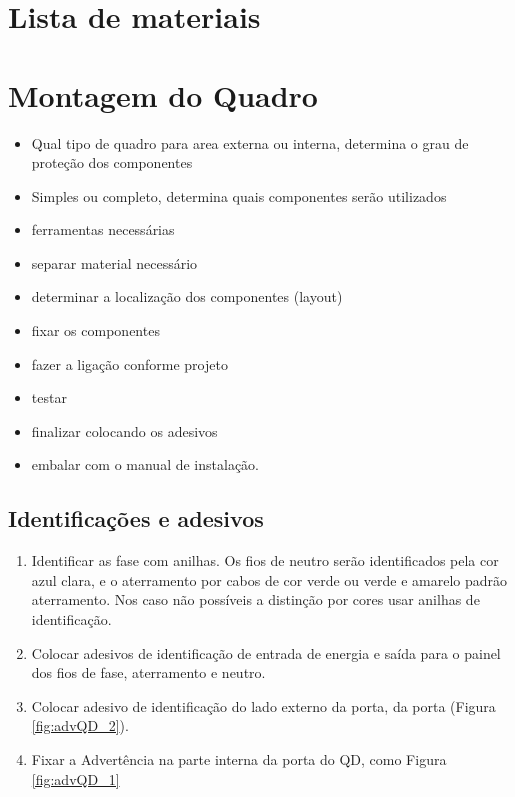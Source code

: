 \section{Lista de materiais}



\section{Montagem do Quadro}
\begin{itemize}
\item Qual tipo de quadro
\subitem para area externa ou interna, determina o grau de proteção dos componentes
\item Simples ou completo, determina quais componentes serão utilizados
\item ferramentas necessárias
\item  separar material necessário
\item determinar a localização dos componentes (layout)
\item fixar os componentes
\item fazer a ligação conforme projeto
\item testar
\item finalizar colocando os adesivos 
\item embalar com o manual de instalação. 

\end{itemize}

\subsection{Identificações e adesivos}
\begin{enumerate}
\item Identificar as fase com anilhas. Os fios de neutro serão identificados pela cor azul clara, e o aterramento por cabos de cor verde ou verde e amarelo padrão aterramento. Nos caso não possíveis a distinção por cores usar anilhas de identificação.
\item Colocar adesivos de identificação de entrada de energia e saída para o painel dos fios de fase, aterramento e neutro.
\item  Colocar adesivo de identificação do lado externo da porta, da porta (Figura \ref{fig:advQD_2}).
\item Fixar a Advertência na parte interna da porta do QD, como Figura \ref{fig:advQD_1}
\end{enumerate}


